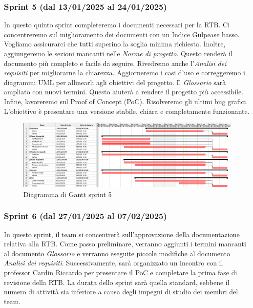 \subsubsection{Sprint 5 (dal 13/01/2025 al 24/01/2025)}
In questo quinto sprint completeremo i documenti necessari per la RTB. Ci
concentreremo sul miglioramento dei documenti con un Indice Gulpease basso.
Vogliamo assicurarci che tutti superino la soglia minima richiesta. Inoltre,
aggiungeremo le sezioni mancanti nelle \textit{Norme di progetto}. Questo
renderà il documento più completo e facile da seguire. Rivedremo anche
l'\textit{Analisi dei requisiti} per migliorarne la chiarezza. Aggiorneremo i
casi d'uso e correggeremo i diagrammi UML per allinearli agli obiettivi del
progetto. Il \textit{Glossario} sarà ampliato con nuovi termini. Questo aiuterà
a rendere il progetto più accessibile. Infine, lavoreremo sul Proof of Concept
(PoC). Risolveremo gli ultimi bug grafici. L'obiettivo è presentare una
versione stabile, chiara e completamente funzionante.

\begin{figure}[h!]
    \centering
    \includegraphics[scale = 0.4]{template/images/gantt5.png}
    \caption{Diagramma di Gantt sprint 5}
    \label{fig:3.5} %
\end{figure}
\newpage

\subsubsection{Sprint 6 (dal 27/01/2025 al 07/02/2025)}
In questo sprint, il team si concentrerà sull'approvazione della documentazione
relativa alla RTB. Come passo preliminare, verranno aggiunti i termini mancanti
al documento \textit{Glossario} e verranno eseguite piccole modifiche al
documento \textit{Analisi dei requisiti}. Successivamente, sarà organizzato un
incontro con il professor Cardin Riccardo per presentare il PoC e completare la
prima fase di revisione della RTB. La durata dello sprint sarà quella standard,
sebbene il numero di attività sia inferiore a causa degli impegni di studio dei
membri del team.

